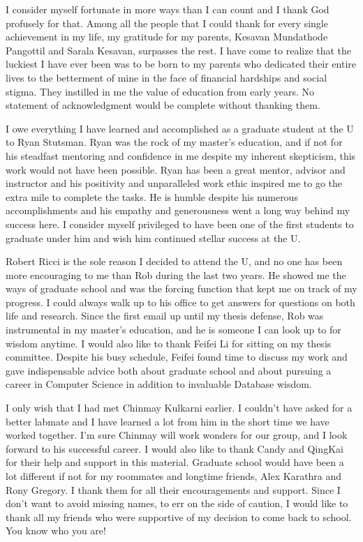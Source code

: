 I consider myself fortunate in more ways than I can count and I thank God profusely for that. Among all the people that I could thank for every single achievement in my life, my gratitude for my parents, Kesavan Mundathode Pangottil
and Sarala Kesavan, surpasses the rest. I have come to realize that the luckiest I have ever been was to be born to my parents who dedicated their entire lives to the betterment of mine in the face of financial hardships and social stigma. They instilled in me the value of education from early years. No statement of acknowledgment would be complete without thanking them.

I owe everything I have learned and accomplished as a graduate student at the U to Ryan Stutsman. Ryan was the rock of my master's education, and if not for his steadfast mentoring and confidence in me despite my inherent skepticism, this work would not have been possible.
Ryan has been a great mentor, advisor and instructor and his positivity and unparalleled work ethic inspired me to go the extra mile to complete the tasks. He is humble despite his numerous accomplishments and his empathy and generousness went a long way behind my success here.
I consider myself privileged to have been one of the first students to graduate under him and wish him continued stellar success at the U.

Robert Ricci is the sole reason I decided to attend the U, and no one has been more encouraging to me than Rob during the last two years. He showed me the ways of graduate school and
was the forcing function that kept me on track of my progress. I could always walk up to his office to get answers for questions on both life and research. Since the first email up until my thesis defense, Rob was instrumental in my master's education, and he is someone I can look up to for wisdom anytime.
I would also like to thank Feifei Li for sitting on my thesis committee. Despite his busy schedule, Feifei found time to discuss my work and gave indispensable advice both about graduate school and about pursuing a career in Computer Science in addition to invaluable Database wisdom.

I only wish that I had met Chinmay Kulkarni earlier. I couldn't have asked for a better labmate and I have learned a lot from him in the short time we have worked together.
I'm sure Chinmay will work wonders for our group, and I look forward to his successful career. I would also like to thank Candy and QingKai for their help and support in this material.
Graduate school would have been a lot different if not for my roommates and longtime friends, Alex Karathra and Rony Gregory. I thank them for all their encouragements and support.
Since I don't want to avoid missing names, to err on the side of caution, I would like to thank all my friends who were supportive of my decision to come back to school. You know who you are!

